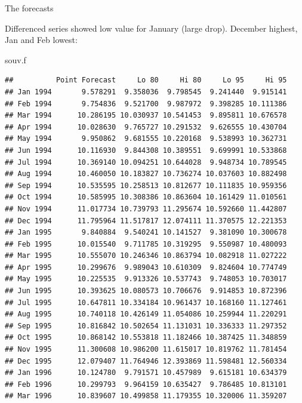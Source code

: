 \documentclass[ignorenonframetext,]{beamer}
\newenvironment{Shaded}{\begin{snugshade}}{\end{snugshade}}
\newcommand{\NormalTok}[1]{#1}
\begin{document}
\begin{frame}[fragile]{The forecasts}
\protect\hypertarget{the-forecasts}{}

Differenced series showed low value for January (large drop). December
highest, Jan and Feb lowest:

\scriptsize

\begin{Shaded}
\begin{Highlighting}[]
\NormalTok{souv.f}
\end{Highlighting}
\end{Shaded}

\begin{verbatim}
##          Point Forecast     Lo 80     Hi 80     Lo 95     Hi 95
## Jan 1994       9.578291  9.358036  9.798545  9.241440  9.915141
## Feb 1994       9.754836  9.521700  9.987972  9.398285 10.111386
## Mar 1994      10.286195 10.030937 10.541453  9.895811 10.676578
## Apr 1994      10.028630  9.765727 10.291532  9.626555 10.430704
## May 1994       9.950862  9.681555 10.220168  9.538993 10.362731
## Jun 1994      10.116930  9.844308 10.389551  9.699991 10.533868
## Jul 1994      10.369140 10.094251 10.644028  9.948734 10.789545
## Aug 1994      10.460050 10.183827 10.736274 10.037603 10.882498
## Sep 1994      10.535595 10.258513 10.812677 10.111835 10.959356
## Oct 1994      10.585995 10.308386 10.863604 10.161429 11.010561
## Nov 1994      11.017734 10.739793 11.295674 10.592660 11.442807
## Dec 1994      11.795964 11.517817 12.074111 11.370575 12.221353
## Jan 1995       9.840884  9.540241 10.141527  9.381090 10.300678
## Feb 1995      10.015540  9.711785 10.319295  9.550987 10.480093
## Mar 1995      10.555070 10.246346 10.863794 10.082918 11.027222
## Apr 1995      10.299676  9.989043 10.610309  9.824604 10.774749
## May 1995      10.225535  9.913326 10.537743  9.748053 10.703017
## Jun 1995      10.393625 10.080573 10.706676  9.914853 10.872396
## Jul 1995      10.647811 10.334184 10.961437 10.168160 11.127461
## Aug 1995      10.740118 10.426149 11.054086 10.259944 11.220291
## Sep 1995      10.816842 10.502654 11.131031 10.336333 11.297352
## Oct 1995      10.868142 10.553818 11.182466 10.387425 11.348859
## Nov 1995      11.300608 10.986200 11.615017 10.819762 11.781454
## Dec 1995      12.079407 11.764946 12.393869 11.598481 12.560334
## Jan 1996      10.124780  9.791571 10.457989  9.615181 10.634379
## Feb 1996      10.299793  9.964159 10.635427  9.786485 10.813101
## Mar 1996      10.839607 10.499858 11.179355 10.320006 11.359207
\end{verbatim}


\end{frame}
\end{document}
